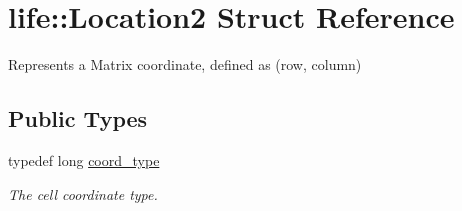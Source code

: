 \hypertarget{structlife_1_1_location2}{}\section{life\+::Location2 Struct Reference}
\label{structlife_1_1_location2}


Represents a Matrix coordinate, defined as (row, column)  


\subsection*{Public Types}
\begin{DoxyCompactItemize}
\item 
typedef long \mbox{\hyperlink{structlife_1_1_location2_abad0c81db789cf9a9f4396ac0c0ef06b}{coord\+\_\+type}}
\begin{DoxyCompactList}\small\item\em The cell coordinate type. \end{DoxyCompactList}\end{DoxyCompactItemize}

